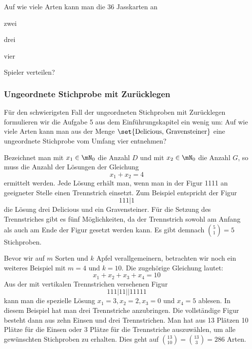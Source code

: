 \documentclass[%
11pt,%
twoside,%
titlepage,%
german,%
headsepline%
]{scrartcl}
\begin{document}
\begin{ueb}[Jass]
Auf wie viele Arten kann man die 36 Jasskarten an

\begin{minipage}{2cm}
\begin{enumeratea}
\item zwei
\end{enumeratea}
\end{minipage}
\begin{minipage}{2cm}
\begin{enumeratea}
\addtocounter{enumi}{1}
\item drei
\end{enumeratea}
\end{minipage}
\begin{minipage}{2cm}
\begin{enumeratea}
\addtocounter{enumi}{2}
\item vier
\end{enumeratea}
\end{minipage}

Spieler verteilen?
\end{ueb}

\subsubsection{Ungeordnete Stichprobe mit Zurücklegen}
Für den schwierigsten Fall der ungeordneten Stichproben mit Zurücklegen formulieren wir die Aufgabe 5 aus dem Einführungskapitel ein wenig um: Auf wie viele Arten kann man aus der Menge $\set{\text{Delicious, Gravensteiner}}$ eine ungeordnete Stichprobe vom Umfang vier entnehmen?

Bezeichnet man mit $x_1\in\mN_0$ die Anzahl $D$ und mit $x_2\in\mN_0$ die Anzahl $G$, so muss die Anzahl der Lösungen der Gleichung $$x_1+x_2=4$$ ermittelt werden. Jede Lösung erhält man, wenn man in der Figur 1111 an geeigneter Stelle einen Trennstrich einsetzt. Zum Beispiel entspricht der Figur $$111|1$$ die Lösung drei Delicious und ein Gravensteiner. Für die Setzung des Trennstriches gibt es fünf Möglichkeiten, da der Trennstrich sowohl am Anfang als auch am Ende der Figur gesetzt werden kann. Es gibt demnach $\binom{5}{1}=5$ Stichproben.

Bevor wir auf $m$ Sorten und $k$ Apfel verallgemeinern, betrachten wir noch ein weiteres Beispiel mit $m=4$ und $k=10$. Die zugehörige Gleichung lautet: $$x_1+x_2+x_3+x_4=10$$ Aus der mit vertikalen Trennstrichen versehenen Figur $$111|11||11111$$ kann man die spezielle Lösung $x_1 = 3, x_2 = 2, x_3 = 0$ und $x_4 = 5$ ablesen. In diesem Beispiel hat man drei Trennstriche anzubringen. Die vollständige Figur besteht dann aus zehn Einsen und drei Trennstrichen. Man hat aus 13 Plätzen 10 Plätze für die Einsen oder 3 Plätze für die Trennstriche
auszuwählen, um alle gewünschten Stichproben zu erhalten. Dies geht auf $\binom{13}{10}=\binom{13}{3}=286$ Arten.
\end{document}
